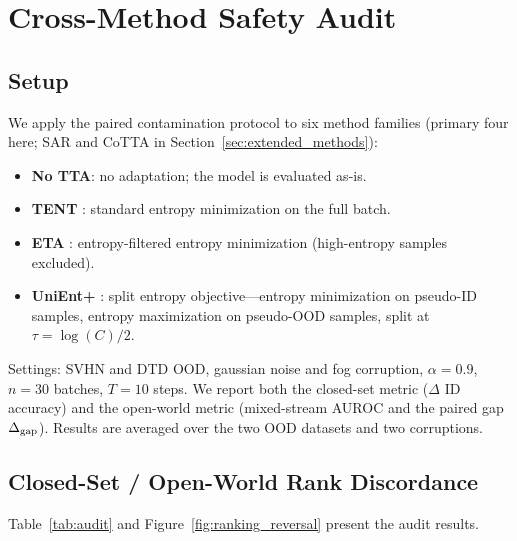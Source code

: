 \section{Cross-Method Safety Audit}
\label{sec:audit}

\subsection{Setup}

We apply the paired contamination protocol to six method families (primary four here; SAR and CoTTA in Section~\ref{sec:extended_methods}):
\begin{itemize}[leftmargin=*,topsep=2pt,itemsep=1pt]
  \item \textbf{No TTA}: no adaptation; the model is evaluated as-is.
  \item \textbf{TENT} \citep{tent}: standard entropy minimization on the full batch.
  \item \textbf{ETA} \citep{eta}: entropy-filtered entropy minimization (high-entropy samples excluded).
  \item \textbf{UniEnt+} \citep{unient}: split entropy objective---entropy minimization on pseudo-ID samples, entropy maximization on pseudo-OOD samples, split at $\tau = \log(C)/2$.
\end{itemize}

Settings: SVHN and DTD OOD, gaussian noise and fog corruption, $\alpha = 0.9$, $n = 30$ batches, $T = 10$ steps.
We report both the closed-set metric ($\Delta$ ID accuracy) and the open-world metric (mixed-stream AUROC and the paired gap $\Delta_{\text{gap}}$).
Results are averaged over the two OOD datasets and two corruptions.

\subsection{Closed-Set / Open-World Rank Discordance}

Table~\ref{tab:audit} and Figure~\ref{fig:ranking_reversal} present the audit results.

